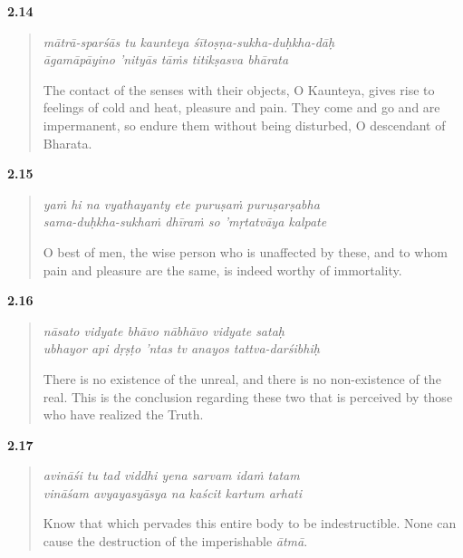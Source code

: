 \par\noindent\textbf{2.14}\par
\begin{verse}
\textit{mātrā-sparśās tu kaunteya śītoṣṇa-sukha-duḥkha-dāḥ} \\
\textit{āgamāpāyino ’nityās tāṁs titikṣasva bhārata}

\noindent The contact of the senses with their objects, O Kaunteya, gives rise to feelings of cold and heat, pleasure and pain. They come and go and are impermanent, so endure them without being disturbed, O descendant of Bharata.
\end{verse}
\par



\par\noindent\textbf{2.15}\par
\begin{verse}
\textit{yaṁ hi na vyathayanty ete puruṣaṁ puruṣarṣabha} \\
\textit{sama-duḥkha-sukhaṁ dhīraṁ so ’mṛtatvāya kalpate}

\noindent O best of men, the wise person who is unaffected by these, and to whom pain and pleasure are the same, is indeed worthy of immortality.
\end{verse}
\par



\par\noindent\textbf{2.16}\par
\begin{verse}
\textit{nāsato vidyate bhāvo nābhāvo vidyate sataḥ} \\
\textit{ubhayor api dṛṣṭo ’ntas tv anayos tattva-darśibhiḥ}

\noindent There is no existence of the unreal, and there is no non-existence of the real. This is the conclusion regarding these two that is perceived by those who have realized the Truth.
\end{verse}
\par



\par\noindent\textbf{2.17}\par
\begin{verse}
\textit{avināśi tu tad viddhi yena sarvam idaṁ tatam} \\
\textit{vināśam avyayasyāsya na kaścit kartum arhati}

\noindent Know that which pervades this entire body to be indestructible. None can cause the destruction of the imperishable \textit{ātmā}.
\end{verse}
\par



